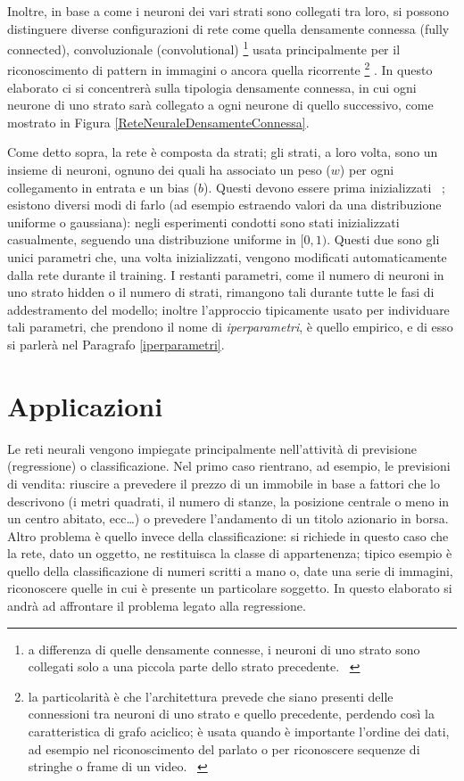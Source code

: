 \documentclass[12pt]{report}
\begin{document}
Inoltre, in base a come i neuroni dei vari strati sono collegati tra loro, si possono distinguere diverse configurazioni di rete come quella densamente connessa (fully connected), convoluzionale (convolutional) \footnote{a differenza di quelle densamente connesse, i neuroni di uno strato sono collegati solo a una piccola parte dello strato precedente. ~\cite{Convolutional}} usata principalmente per il riconoscimento di pattern in immagini o ancora quella ricorrente \footnote{la particolarità è che l'architettura prevede che siano presenti delle connessioni tra neuroni di uno strato e quello precedente, perdendo così la caratteristica di grafo aciclico; è usata quando è importante l'ordine dei dati, ad esempio nel riconoscimento del parlato o per riconoscere sequenze di stringhe o frame di un video. ~\cite{Recurrent}} .
In questo elaborato ci si concentrerà sulla tipologia densamente connessa, in cui ogni neurone di uno strato sarà collegato a ogni neurone di quello successivo, come mostrato in Figura \ref{ReteNeuraleDensamenteConnessa}.

Come detto sopra, la rete è composta da strati; gli strati, a loro volta, sono un insieme di neuroni, ognuno dei quali ha associato un peso ($w$) per ogni collegamento in entrata e un bias ($b$). Questi devono essere prima inizializzati ~\cite{ParametersInitialization}; esistono diversi modi di farlo (ad esempio estraendo valori da una distribuzione uniforme o gaussiana): negli esperimenti condotti sono stati inizializzati casualmente, seguendo una distribuzione uniforme in $[0, 1)$. Questi due sono gli unici parametri che, una volta inizializzati, vengono modificati automaticamente dalla rete durante il training. I restanti parametri, come il numero di neuroni in uno strato hidden o il numero di strati, rimangono tali durante tutte le fasi di addestramento del modello; inoltre l'approccio tipicamente usato per individuare tali parametri, che prendono il nome di \textit{iperparametri}, è quello empirico, e di esso si parlerà nel Paragrafo \ref{iperparametri}.

\section{Applicazioni}
Le reti neurali vengono impiegate principalmente nell’attività di previsione (regressione) o classificazione.
Nel primo caso rientrano, ad esempio, le previsioni di vendita: riuscire a prevedere il prezzo di un immobile in base a fattori che lo descrivono (i metri quadrati, il numero di stanze, la posizione centrale o meno in un centro abitato, ecc…) o prevedere l’andamento di un titolo azionario in borsa.
Altro problema è quello invece della classificazione: si richiede in questo caso che la rete, dato un oggetto, ne restituisca la classe di appartenenza; tipico esempio è quello della classificazione di numeri scritti a mano o, date una serie di immagini, riconoscere quelle in cui è presente un particolare soggetto.
In questo elaborato si andrà ad affrontare il problema legato alla regressione.
\end{document}
